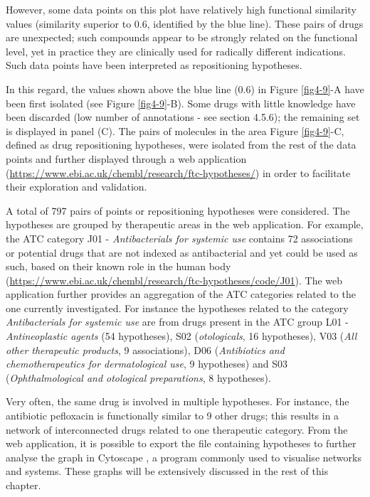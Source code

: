 However, some data points on this plot have relatively high functional similarity values (similarity superior to 0.6, identified by the blue line). These pairs of drugs are unexpected; such compounds appear to be strongly related on the functional level, yet in practice they are clinically used for radically different indications. Such data points have been interpreted as repositioning hypotheses.

In this regard, the values shown above the blue line (0.6) in Figure \ref{fig4-9}-A have been first isolated (see Figure \ref{fig4-9}-B). Some drugs with little knowledge have been discarded (low number of annotations - see section 4.5.6); the remaining set is displayed in panel (C). The pairs of molecules in the area Figure \ref{fig4-9}-C, defined as drug repositioning hypotheses, were isolated from the rest of the data points and further displayed through a web application (\url{https://www.ebi.ac.uk/chembl/research/ftc-hypotheses/}) in order to facilitate their exploration and validation.

A total of 797 pairs of points or repositioning hypotheses were considered. The hypotheses are grouped by therapeutic areas in the web application. For example, the ATC category J01 - \emph{Antibacterials for systemic use} contains 72 associations or potential drugs that are not indexed as antibacterial and yet could be used as such, based on their known role in the human body (\url{https://www.ebi.ac.uk/chembl/research/ftc-hypotheses/code/J01}). The web application further provides an aggregation of the ATC categories related to the one currently investigated. For instance the hypotheses related to the category \emph{Antibacterials for systemic use} are from drugs present in the ATC group L01 - \emph{Antineoplastic agents} (54 hypotheses), S02 (\emph{otologicals}, 16 hypotheses), V03 (\emph{All other therapeutic products}, 9 associations), D06 (\emph{Antibiotics and chemotherapeutics for dermatological use}, 9 hypotheses) and S03 (\emph{Ophthalmological and otological preparations}, 8 hypotheses).

Very often, the same drug is involved in multiple hypotheses. For instance, the antibiotic pefloxacin is functionally similar to 9 other drugs; this results in a network of interconnected drugs related to one therapeutic category. From the web application, it is possible to export the file containing hypotheses to further analyse the graph in Cytoscape \citep{shannon2003cytoscape}, a program commonly used to visualise networks and systems. These graphs will be extensively discussed in the rest of this chapter.

